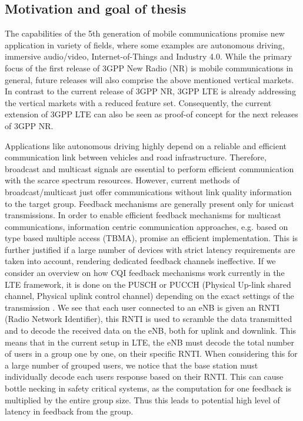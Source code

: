 \documentclass{article}
\begin{document}
\subsection{Motivation and goal of thesis}
The capabilities of the 5th generation of mobile communications promise new application in variety of
fields, where some examples are autonomous driving, immersive audio/video, Internet-of-Things and Industry 4.0. While the primary focus of the first release of 3GPP New Radio (NR) is mobile communications in general, future releases will also comprise the above mentioned vertical markets. In contrast to the current release of 3GPP NR, 3GPP LTE is already addressing the vertical markets with a reduced feature set. Consequently, the current extension of 3GPP LTE can also be seen as proof-of concept for the next releases of 3GPP NR.

Applications like autonomous driving highly depend on a reliable and efficient communication link between vehicles and road infrastructure. Therefore, broadcast and multicast signals are essential to perform efficient communication with the scarce spectrum resources. However, current methods of broadcast/multicast just offer communications without link quality information to the target group. Feedback mechanisms are generally present only for unicast transmissions. In order to enable efficient feedback mechanisms for multicast communications, information centric communication approaches, e.g. based on type based multiple access (TBMA)\cite{tbma}, promise an efficient implementation. This is further justified if a large number of devices with strict latency requirements are taken into account, rendering dedicated feedback channels ineffective. If we consider an overview on how CQI feedback mechanisms work currently in the LTE framework, it is done on the PUSCH or PUCCH (Physical Up-link shared channel, Physical uplink control channel) depending on the exact settings of the transmission \cite{ETSITS136213}. We see that each user connected to an eNB is given an RNTI (Radio Network Identifier), this RNTI is used to scramble the data transmitted and to decode the received data on the eNB, both for uplink and downlink. This means that in the current setup in LTE, the eNB must decode the total number of users in a group one by one, on their specific RNTI. When considering this for a large number of grouped users, we notice that the base station must individually decode each users response based on their RNTI. This can cause bottle necking in safety critical systems, as the computation for one feedback is multiplied by the entire group size. Thus this leads to potential high level of latency in feedback from the group.
\end{document}
